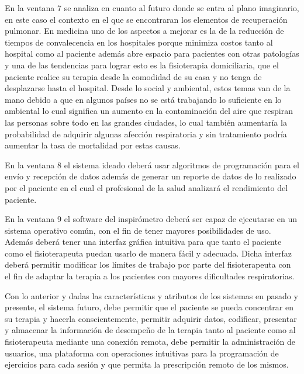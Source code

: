 \documentclass[12pt]{article}
\begin{document}

En la ventana 7 se analiza en cuanto al futuro donde se entra al plano imaginario, en este caso el contexto en el que se encontraran los elementos de recuperación pulmonar. En medicina uno de los aspectos a mejorar es la de la reducción de tiempos de convalecencia en los hospitales porque minimiza costos tanto al hospital como al paciente además abre espacio para pacientes con otras patologías y una de las tendencias para lograr esto es la fisioterapia domiciliaria, que el paciente realice su terapia desde la comodidad de su casa y no tenga de desplazarse hasta el hospital. Desde lo social y ambiental, estos temas van de la mano debido a que en algunos países no se está trabajando lo suficiente en lo ambiental lo cual significa un aumento en la contaminación del aire que respiran las personas sobre todo en las grandes ciudades, lo cual también aumentaría la probabilidad de adquirir algunas afección respiratoria y sin tratamiento podría aumentar la tasa de mortalidad por estas causas. 


En la ventana 8 el sistema ideado deberá usar algoritmos de programación para el envío y recepción de datos además de generar un reporte de datos de lo realizado por el paciente en el cual el profesional de la salud analizará el rendimiento del paciente.


En la ventana 9 el software del inspirómetro deberá ser capaz de ejecutarse en un sistema operativo común, con el fin de tener mayores posibilidades de uso.  Además deberá tener una interfaz gráfica intuitiva para que tanto el paciente como el fisioterapeuta puedan usarlo de manera fácil y adecuada. Dicha interfaz deberá permitir modificar los límites de trabajo por parte del fisioterapeuta con el fin de adaptar la terapia a los pacientes con mayores dificultades respiratorias. 


Con lo anterior y dadas las características y atributos de los sistemas en pasado y presente, el sistema futuro, debe permitir que el paciente se pueda concentrar en su terapia y hacerla conscientemente, permitir adquirir datos, codificar, presentar y almacenar la información de desempeño de la terapia tanto al paciente como al fisioterapeuta mediante una conexión remota, debe permitir la administración de usuarios, una plataforma con operaciones intuitivas para la programación de ejercicios para cada sesión y que permita la prescripción remoto de los mismos.
\end{document}
